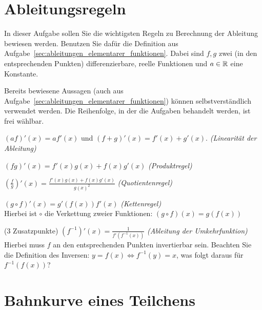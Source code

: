 \documentclass{scrartcl}
\begin{document}
\maketitle


\section{Ableitungsregeln}
\label{sec:ableitungsregeln}

In dieser Aufgabe sollen Sie die wichtigsten Regeln zu Berechnung der Ableitung bewiesen werden.
Benutzen Sie dafür die Definition aus Aufgabe~\ref{sec:ableitungen_elementarer_funktionen}.
Dabei sind $f, g$ zwei (in den entsprechenden Punkten) differenzierbare, reelle Funktionen und $a \in \mathbb{R}$ eine Konstante.

Bereits bewiesene Aussagen (auch aus Aufgabe~\ref{sec:ableitungen_elementarer_funktionen}) können selbstverständlich verwendet werden.
Die Reihenfolge, in der die Aufgaben behandelt werden, ist frei wählbar.

\begin{subex}
  \item $(a f)'(x) = a f'(x)$ und $(f + g)'(x) = f'(x) + g'(x).$ \emph{(Linearität der Ableitung)}
  \item $(f g)'(x) = f'(x) g(x) + f(x) g'(x)$ \emph{(Produktregel)}
  \item $\left( \frac{f}{g} \right)'(x) = \frac{f'(x) g(x) + f(x) g'(x)}{g(x)^2}$ \emph{(Quotientenregel)}
  \item $(g \circ f)'(x) = g'(f(x)) f'(x)$ \emph{(Kettenregel)}\\
  Hierbei ist $\circ$ die Verkettung zweier Funktionen: $(g \circ f)(x) = g(f(x))$
  \item(3 Zusatzpunkte) $(f^{-1})'(x) = \frac{1}{f'\left( f^{-1}(x) \right)}$ \emph{(Ableitung der Umkehrfunktion)}\\
  Hierbei muss $f$ an den entsprechenden Punkten invertierbar sein.
  Beachten Sie die Definition des Inversen: $y = f(x) \iff f^{-1}(y) = x$, was folgt daraus für $f^{-1}(f(x))$?
\end{subex}


\section{Bahnkurve eines Teilchens}
\label{sec:bahnkurve_eines_teilchens}
\end{document}
